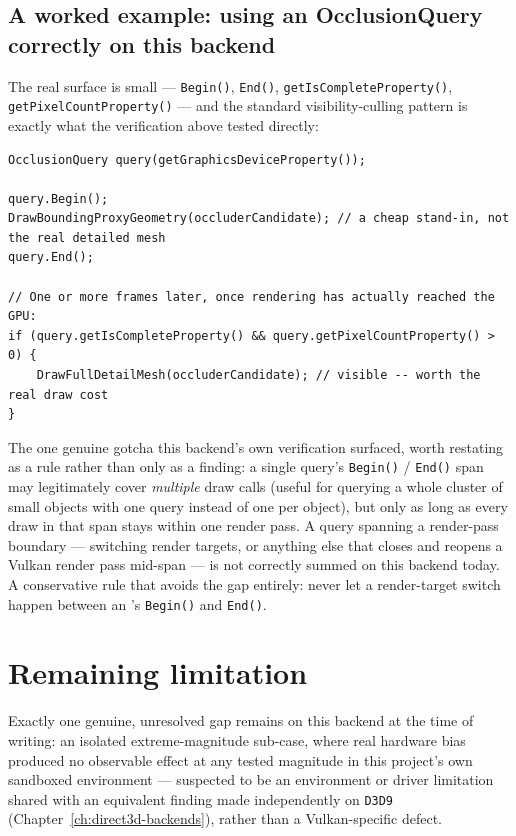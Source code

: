 \subsection{A worked example: using an OcclusionQuery correctly on this backend}

The real  surface is small --- \texttt{Begin()}, \texttt{End()},
\texttt{getIsCompleteProperty()}, \texttt{getPixelCountProperty()} --- and the standard
visibility-culling pattern is exactly what the verification above tested directly:

\begin{lstlisting}
OcclusionQuery query(getGraphicsDeviceProperty());

query.Begin();
DrawBoundingProxyGeometry(occluderCandidate); // a cheap stand-in, not the real detailed mesh
query.End();

// One or more frames later, once rendering has actually reached the GPU:
if (query.getIsCompleteProperty() && query.getPixelCountProperty() > 0) {
    DrawFullDetailMesh(occluderCandidate); // visible -- worth the real draw cost
}
\end{lstlisting}

The one genuine gotcha this backend's own verification surfaced, worth restating as a rule
rather than only as a finding: a single query's \texttt{Begin()} / \texttt{End()} span may
legitimately cover \emph{multiple} draw calls (useful for querying a whole cluster of small
objects with one query instead of one per object), but only as long as every draw in that span
stays within one render pass. A query spanning a render-pass boundary --- switching render
targets, or anything else that closes and reopens a Vulkan render pass mid-span --- is not
correctly summed on this backend today. A conservative rule that avoids the gap entirely:
never let a render-target switch happen between an 's \texttt{Begin()}
and \texttt{End()}.

\section{Remaining limitation}
\label{sec:vulkan-depthbias}

Exactly one genuine, unresolved gap remains on this backend at the time of writing: an
isolated  extreme-magnitude sub-case, where real hardware
bias produced no observable effect at any tested magnitude in this project's own sandboxed
environment --- suspected to be an environment or driver limitation shared with an equivalent
finding made independently on \texttt{D3D9} (Chapter~\ref{ch:direct3d-backends}), rather than
a Vulkan-specific defect.

